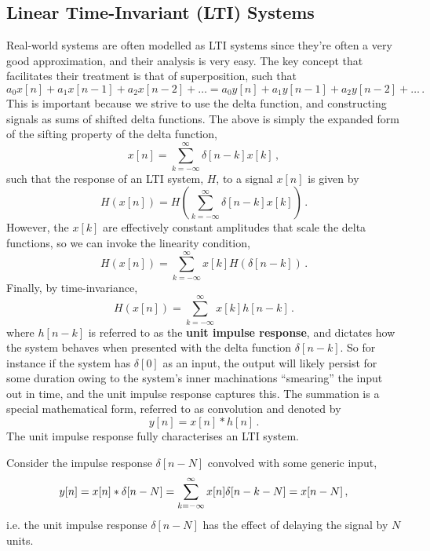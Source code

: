 \subsection{Linear Time-Invariant (LTI) Systems}
%
Real-world systems are often modelled as LTI systems since they're often a very good approximation,
and their analysis is very easy. The key concept that facilitates their treatment is that of
superposition, such that
%
\begin{equation}
  a_0x[n] + a_1x[n-1] + a_2x[n-2] + \hdots = a_0y[n] + a_1y[n-1] + a_2y[n-2] + \hdots \,.
\end{equation}
%
This is important because we strive to use the delta function, and constructing signals as
sums of shifted delta functions. The above is simply the expanded form of the sifting property
of the delta function,
%
\begin{displaymath}
  x[n] = \sum_{k=-\infty}^\infty \delta[n-k]x[k] \,,
\end{displaymath}
%
such that the response of an LTI system, $H$, to a signal $x[n]$ is given by
%
\begin{equation}
  H(x[n]) = H\left( \sum_{k=-\infty}^\infty \delta[n-k]x[k] \right) \,.
\end{equation}
%
However, the $x[k]$ are effectively constant amplitudes that scale the delta functions,
so we can invoke the linearity condition,
%
\begin{equation}
  H(x[n]) = \sum_{k=-\infty}^\infty x[k] H(\delta[n-k]) \,.
\end{equation}
%
Finally, by time-invariance,
%
\begin{equation}
  H(x[n]) = \sum_{k=-\infty}^\infty x[k] h[n-k] \,.
\end{equation}
%
where $h[n-k]$ is referred to as the \textbf{unit impulse response}, and dictates how
the system behaves when presented with the delta function $\delta[n-k]$. So for
instance if the system has $\delta[0]$ as an input, the output will likely persist
for some duration owing to the system's inner machinations ``smearing'' the input out
in time, and the unit impulse response captures this.
The summation is a special mathematical form, referred to as convolution and denoted by
%
\begin{equation}
  y[n] = x[n] * h[n] \,.
\end{equation}
%
The unit impulse response fully characterises an LTI system.
%
\begin{exmp}
  Consider the impulse response $\delta[n-N]$ convolved with some generic input,
  \begin{displaymath}
    y[n] = x[n] * \delta[n-N] = \sum_{k=-\infty}^\infty x[n]\delta[n-k-N] = x[n-N] \,,
  \end{displaymath}
  i.e. the unit impulse response $\delta[n-N]$ has the effect of delaying the
  signal by $N$ units.
\end{exmp}

